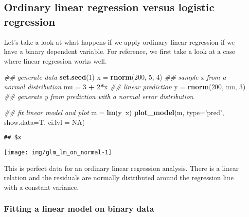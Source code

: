 \documentclass[
]{article}
\newenvironment{Shaded}{\begin{snugshade}}{\end{snugshade}}
\newcommand{\CommentTok}[1]{\textcolor[rgb]{0.56,0.35,0.01}{\textit{#1}}}
\newcommand{\DataTypeTok}[1]{\textcolor[rgb]{0.13,0.29,0.53}{#1}}
\newcommand{\DecValTok}[1]{\textcolor[rgb]{0.00,0.00,0.81}{#1}}
\newcommand{\KeywordTok}[1]{\textcolor[rgb]{0.13,0.29,0.53}{\textbf{#1}}}
\newcommand{\NormalTok}[1]{#1}
\newcommand{\OperatorTok}[1]{\textcolor[rgb]{0.81,0.36,0.00}{\textbf{#1}}}
\newcommand{\OtherTok}[1]{\textcolor[rgb]{0.56,0.35,0.01}{#1}}
\newcommand{\StringTok}[1]{\textcolor[rgb]{0.31,0.60,0.02}{#1}}
\begin{document}
\hypertarget{ordinary-linear-regression-versus-logistic-regression}{%
\subsection{Ordinary linear regression versus logistic
regression}\label{ordinary-linear-regression-versus-logistic-regression}}

Let's take a look at what happens if we apply ordinary linear regression
if we have a binary dependent variable. For reference, we first take a
look at a case where linear regression works well.

\begin{Shaded}
\begin{Highlighting}[]
\CommentTok{## generate data}
\KeywordTok{set.seed}\NormalTok{(}\DecValTok{1}\NormalTok{)}
\NormalTok{x =}\StringTok{ }\KeywordTok{rnorm}\NormalTok{(}\DecValTok{200}\NormalTok{, }\DecValTok{5}\NormalTok{, }\DecValTok{4}\NormalTok{)        }\CommentTok{## sample x from a normal distribution}
\NormalTok{mu =}\StringTok{ }\DecValTok{3} \OperatorTok{+}\StringTok{ }\DecValTok{2}\OperatorTok{*}\NormalTok{x                }\CommentTok{## linear prediction}
\NormalTok{y =}\StringTok{ }\KeywordTok{rnorm}\NormalTok{(}\DecValTok{200}\NormalTok{, mu, }\DecValTok{3}\NormalTok{)       }\CommentTok{## generate y from prediction with a normal error distribution}

\CommentTok{## fit linear model and plot}
\NormalTok{m =}\StringTok{ }\KeywordTok{lm}\NormalTok{(y}\OperatorTok{~}\NormalTok{x)}
\KeywordTok{plot_model}\NormalTok{(m, }\DataTypeTok{type=}\StringTok{'pred'}\NormalTok{, }\DataTypeTok{show.data=}\NormalTok{T, }\DataTypeTok{ci.lvl =} \OtherTok{NA}\NormalTok{)}
\end{Highlighting}
\end{Shaded}

\begin{verbatim}
## $x
\end{verbatim}

\begin{center}\texttt{[image: img/glm\_lm\_on\_normal-1]} \end{center}

This is perfect data for an ordinary linear regression analysis. There
is a linear relation and the residuals are normally distributed around
the regression line with a constant variance.

\hypertarget{fitting-a-linear-model-on-binary-data}{%
\subsubsection{Fitting a linear model on binary
data}\label{fitting-a-linear-model-on-binary-data}}
\end{document}
